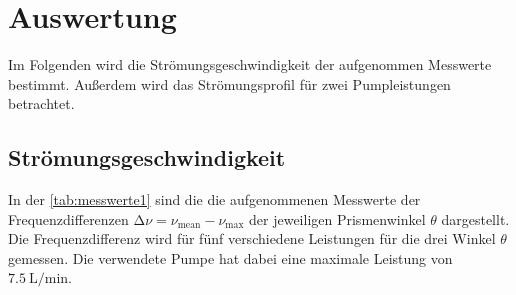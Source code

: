 \section{Auswertung}
\label{sec:auswertung}

Im Folgenden wird die Strömungsgeschwindigkeit der aufgenommen Messwerte bestimmt.
Außerdem wird das Strömungsprofil für zwei Pumpleistungen betrachtet.

% 
% 

\subsection{Strömungsgeschwindigkeit}
\label{sec:Strömungsgeschwindigkeit}

In der \autoref{tab:messwerte1} sind die die aufgenommenen Messwerte der Frequenzdifferenzen $ \increment \nu = \nu_{\text{mean}} - \nu_{\text{max}}$ 
der jeweiligen Prismenwinkel $\theta$ dargestellt. Die Frequenzdifferenz wird für fünf verschiedene Leistungen für die drei Winkel $\theta$ gemessen. Die 
verwendete Pumpe hat dabei eine maximale Leistung von $\SI{7.5}{\liter\per\minute}$.


